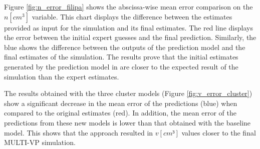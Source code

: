 Figure \ref{fig:n_error_filipa} shows the abscissa-wise mean error comparison on the $n [cm^3]$ variable. This chart displays the difference between the estimates provided as input for the simulation and its final estimates. The red line displays the error between the initial expert guesses and the final prediction. Similarly, the blue shows the difference between the outputs of the prediction model and the final estimates of the simulation. The results prove that the initial estimates generated by the prediction model in \cite{barros_InitialConditionEstimation_} are closer to the expected result of the simulation than the expert estimates. 

The results obtained with the three cluster models (Figure \ref{fig:v_error_cluster}) show a significant decrease in the mean error of the predictions (blue) when compared to the original estimates (red). In addition, the mean error of the predictions from these new models is lower than that obtained with the baseline model. This shows that the approach resulted in $v [cm³]$ values closer to the final MULTI-VP simulation.


